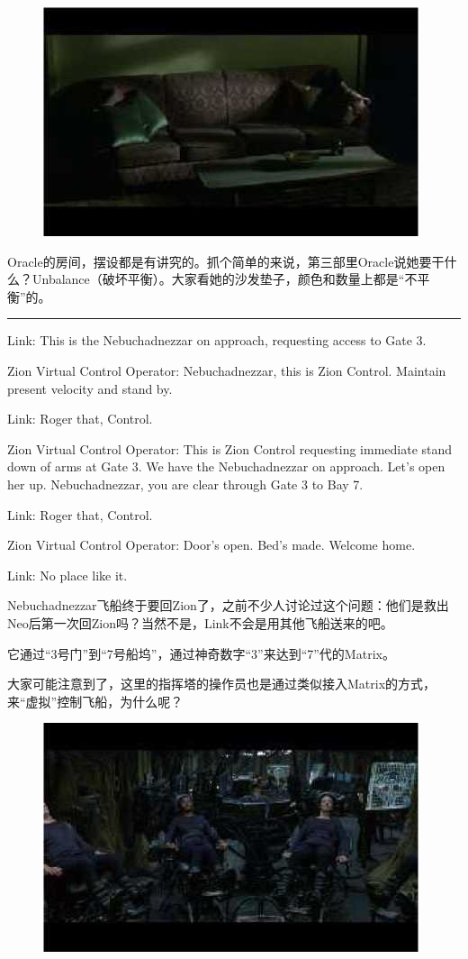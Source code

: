 \documentclass[UTF8]{ctexart}
\newcommand{\myparsep}{\noindent \rule[0.5ex]{\linewidth}{1pt}}
\newenvironment{myquote}{\color{green} \setlength{\leftskip}{6em} \setlength{\rightskip}{4em} \setlength{\parindent}{-2em}}{\par}
\begin{document}
\begin{figure}[htb]
\centering
\includegraphics[width=0.5\linewidth]{fig/read_reloaded-30}
\end{figure}

Oracle的房间，摆设都是有讲究的。抓个简单的来说，第三部里Oracle说她要干什么？Unbalance（破坏平衡）。大家看她的沙发垫子，颜色和数量上都是“不平衡”的。

\myparsep

\begin{myquote}
Link: This is the Nebuchadnezzar on approach, requesting access to Gate 3.

Zion Virtual Control Operator: Nebuchadnezzar, this is Zion Control. Maintain present velocity and stand by.

Link: Roger that, Control.

Zion Virtual Control Operator: This is Zion Control requesting immediate stand down of arms at Gate 3. We have the Nebuchadnezzar on approach. Let's open her up. Nebuchadnezzar, you are clear through Gate 3 to Bay 7.

Link: Roger that, Control.

Zion Virtual Control Operator: Door's open. Bed's made. Welcome home.

Link: No place like it.
\end{myquote}

Nebuchadnezzar飞船终于要回Zion了，之前不少人讨论过这个问题：他们是救出Neo后第一次回Zion吗？当然不是，Link不会是用其他飞船送来的吧。

它通过“3号门”到“7号船坞”，通过神奇数字“3”来达到“7”代的Matrix。

大家可能注意到了，这里的指挥塔的操作员也是通过类似接入Matrix的方式，来“虚拟”控制飞船，为什么呢？

\begin{figure}[htb]
\centering
\includegraphics[width=0.5\linewidth]{fig/read_reloaded-31}
\end{figure}
\end{document}
